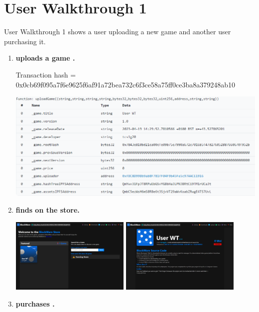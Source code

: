 
\section*{User Walkthrough 1}

User Walkthrough 1 shows a user  uploading a new game  and another user  purchasing it.
\begin{enumerate}[itemsep=2.5pt]
  \item \textbf{ uploads a game .}

  \small Transaction hash = 0x0cb69f095a7f6e9625f6af91a72bea732c6f3ce58a75ff0ce3ba8a379248ab10\normalsize

  \includegraphics[width=\textwidth]{assets/images/user-walkthrough/1/upload.png}


  \item \textbf{ finds  on the store.}
  
  \includegraphics[width=0.45\textwidth]{assets/images/user-walkthrough/1/store.png}
  \includegraphics[width=0.45\textwidth]{assets/images/user-walkthrough/1/store-entry.png}
  
  \item \textbf{ purchases .}
   

\end{enumerate}
